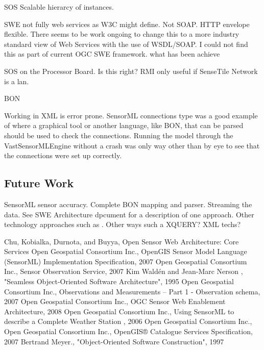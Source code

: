 \documentclass[]{final_report}
\begin{document}
SOS Scalable hierarcy of instances.

SWE not fully web services as W3C might define. Not SOAP. HTTP envelope
flexible. There seems to be work ongoing to change this to a more industry standard view of Web Services with the use of WSDL/SOAP. I could not find this as part of current OGC SWE framework.
what has been achieve

SOS on the Processor Board. Is this right? RMI only useful if SenseTile Network is a lan.

BON

Working in XML is error prone. SensorML connections type was a good example of where a graphical tool or another language, like BON,  that can be parsed should be used to check the connections. Running the model through the VastSensorMLEngine without a crash was only way other than by eye to see that the connections were set up correctly. 


\subsection{Future Work}
SensorML sensor accuracy.
Complete BON mapping and parser.
Streaming the data. See SWE Architecture dpcument for a description of one approach.
Other technology approaches such as . Other ways such a XQUERY? XML techs?

\newpage
\begin{thebibliography}{99}
 Chu, Kobialka,  Durnota, and  Buyya, Open Sensor Web Architecture: Core Services
Open Geospatial Consortium Inc., OpenGIS Sensor Model Language (SensorML) Implementation Specification, 2007
Open Geospatial Consortium Inc.,  Sensor Observation Service, 2007
Kim Waldén and Jean-Marc Nerson , "Seamless Object-Oriented Software Architecture", 1995
Open Geospatial Consortium Inc., Observations and Measurements – Part 1 - Observation schema, 2007
Open Geospatial Consortium Inc., OGC Sensor Web Enablement Architecture, 2008
Open Geospatial Consortium Inc., Using SensorML to describe a
Complete Weather Station , 2006
Open Geospatial Consortium Inc.,
Open Geospatial Consortium Inc., OpenGIS® Catalogue Services Specification, 2007
Bertrand Meyer., "Object-Oriented Software Construction", 1997

\end{thebibliography}
\end{document}
